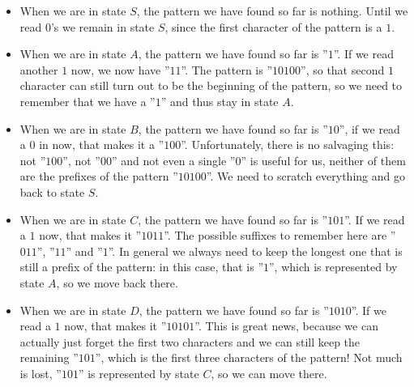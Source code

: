 \begin{itemize}
    \item When we are in state $S$, the pattern we have found so far is nothing. Until we read $0$'s we remain in state $S$, since the first character of the pattern is a $1$.
    \item When we are in state $A$, the pattern we have found so far is ''$1$''. If we read another $1$ now, we now have ''$11$''. The pattern is ''$10100$'', so that second $1$ character can still turn out to be the beginning of the pattern, so we need to remember that we have a ''$1$'' and thus stay in state $A$.
    \item When we are in state $B$, the pattern we have found so far is ''$10$'', if we read a $0$ in now, that makes it a ''$100$''. Unfortunately, there is no salvaging this: not ''$100$'', not ''$00$'' and not even a single ''$0$'' is useful for us, neither of them are the prefixes of the pattern ''$10100$''. We need to scratch everything and go back to state $S$.
    \item When we are in state $C$, the pattern we have found so far is ''$101$''. If we read a $1$ now, that makes it ''$1011$''. The possible suffixes to remember here are ''$011$'', ''$11$'' and ''$1$''. In general we always need to keep the longest one that is still a prefix of the pattern: in this case, that is ''$1$'', which is represented by state $A$, so we move back there.
    \item When we are in state $D$, the pattern we have found so far is ''$1010$''. If we read a $1$ now, that makes it ''$10101$''. This is great news, because we can actually just forget the first two characters and we can still keep the remaining ''$101$'', which is the first three characters of the pattern! Not much is lost, ''$101$'' is represented by state $C$, so we can move there.
\end{itemize}